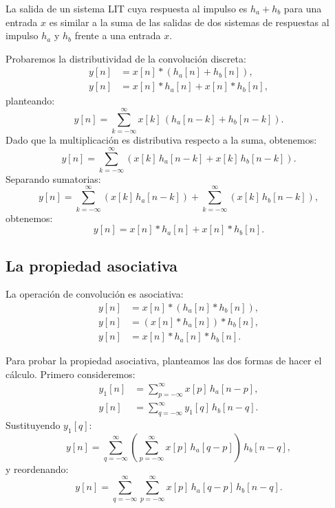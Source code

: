 La salida de un sistema LIT cuya respuesta al impulso es $h_{a} + h_{b}$ para una entrada $x$ es similar a la suma de las salidas de dos sistemas de respuestas al impulso $h_{a}$ y $h_{b}$ frente a una entrada $x$.

Probaremos la distributividad de la convolución discreta:
\begin{align}
	y[n] &= x[n] * \left( h_{a}[n] + h_{b}[n] \right) , \\
	y[n] &= x[n] * h_{a}[n] + x[n] * h_{b}[n],
\end{align}
planteando:
\begin{equation}
	y[n] = \sum_{k=-\infty}^{\infty} x[k] \, \left( h_{a}[n-k] + h_{b}[n-k] \right).
\end{equation}
Dado que la multiplicación es distributiva respecto a la suma, obtenemos:
\begin{equation}
	y[n] = \sum_{k=-\infty}^{\infty} \left( x[k] \, h_{a}[n-k] + x[k] \, h_{b}[n-k] \right).
\end{equation}
Separando sumatorias:
\begin{equation}
	y[n] = \sum_{k=-\infty}^{\infty} \left( x[k] \, h_{a}[n-k] \right) + \sum_{k=-\infty}^{\infty} \left( x[k] \, h_{b}[n-k] \right) ,
\end{equation}
obtenemos:
\begin{equation}
	y[n] = x[n] * h_a[n] + x[n] * h_{b}[n] .
\end{equation}

\subsection{La propiedad asociativa}

La operación de convolución es asociativa:
\begin{align}
	y[n] &= x[n] * \left( h_a[n] * h_{b}[n] \right) , \\
	y[n] &= \left( x[n] * h_a[n] \right) * h_{b}[n] , \\
	y[n] &= x[n] * h_a[n] * h_{b}[n].
\end{align}

Para probar la propiedad asociativa, planteamos las dos formas de hacer el cálculo. Primero consideremos:
\begin{align}
	y_{1}[n] &= \sum_{p=-\infty}^{\infty} x[p] \, h_{a}[n-p], \\
	y[n] &= \sum_{q=-\infty}^{\infty} y_{1}[q] \, h_{b}[n-q].
\end{align}
Sustituyendo $y_1[q]$:
\begin{equation}
	y[n] = \sum_{q=-\infty}^{\infty} \left( \sum_{p=-\infty}^{\infty} x[p] \, h_{a}[q-p] \right) \, h_{b}[n-q],
\end{equation}
y reordenando:
\begin{equation}
	y[n] = \sum_{q=-\infty}^{\infty} \sum_{p=-\infty}^{\infty} x[p] \, h_{a}[q-p] \, h_{b}[n-q]. \label{eq:asoc1}
\end{equation}

